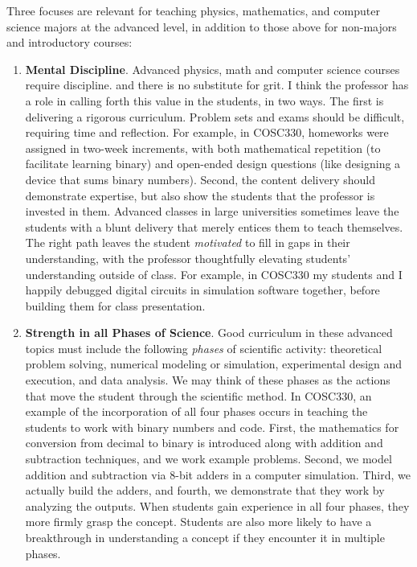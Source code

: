 \documentclass[../../main.tex]{subfiles}
\begin{document}
Three focuses are relevant for teaching physics, mathematics, and computer science majors at the advanced level, in addition to those above for non-majors and introductory courses:
\begin{enumerate}
\item \textbf{Mental Discipline}.  Advanced physics, math and computer science courses require discipline. and there is no substitute for grit.  I think the professor has a role in calling forth this value in the students, in two ways.  The first is delivering a rigorous curriculum.  Problem sets and exams should be difficult, requiring time and reflection.  For example, in COSC330, homeworks were assigned in two-week increments, with both mathematical repetition (to facilitate learning binary) and open-ended design questions (like designing a device that sums binary numbers).  Second, the content delivery should demonstrate expertise, but also show the students that the professor is invested in them.  Advanced classes in large universities sometimes leave the students with a blunt delivery that merely entices them to teach themselves.  The right path leaves the student \textit{motivated} to fill in gaps in their understanding, with the professor thoughtfully elevating students' understanding outside of class.  For example, in COSC330 my students and I happily debugged digital circuits in simulation software together, before building them for class presentation.

\item \textbf{Strength in all Phases of Science}. Good curriculum in these advanced topics must include the following \textit{phases} of scientific activity: theoretical problem solving, numerical modeling or simulation, experimental design and execution, and data analysis.  We may think of these phases as the actions that move the student through the scientific method.  In COSC330, an example of the incorporation of all four phases occurs in teaching the students to work with binary numbers and code.  First, the mathematics for conversion from decimal to binary is introduced along with addition and subtraction techniques, and we work example problems.  Second, we model addition and subtraction via 8-bit adders in a computer simulation.  Third, we actually build the adders, and fourth, we demonstrate that they work by analyzing the outputs.  When students gain experience in all four phases, they more firmly grasp the concept.  Students are also more likely to have a breakthrough in understanding a concept if they encounter it in multiple phases.


\end{enumerate}
\end{document}
